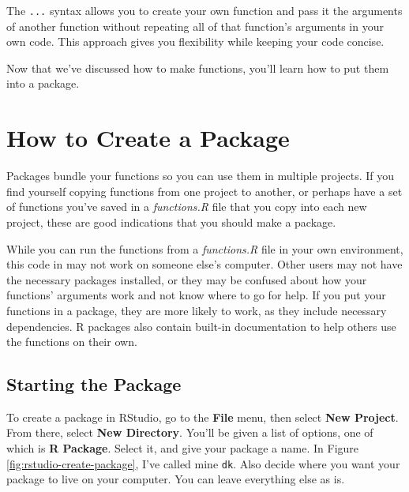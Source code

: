 \documentclass[
]{book}
\begin{document}
The \texttt{...} syntax allows you to create your own function and pass it the arguments of another function without repeating all of that function's arguments in your own code. This approach gives you flexibility while keeping your code concise.

Now that we've discussed how to make functions, you'll learn how to put them into a package.

\hypertarget{how-to-create-a-package}{%
\section*{How to Create a Package}\label{how-to-create-a-package}}

Packages bundle your functions so you can use them in multiple projects. If you find yourself copying functions from one project to another, or perhaps have a set of functions you've saved in a \emph{functions.R} file that you copy into each new project, these are good indications that you should make a package.

While you can run the functions from a \emph{functions.R} file in your own environment, this code in may not work on someone else's computer. Other users may not have the necessary packages installed, or they may be confused about how your functions' arguments work and not know where to go for help. If you put your functions in a package, they are more likely to work, as they include necessary dependencies. R packages also contain built-in documentation to help others use the functions on their own.

\hypertarget{starting-the-package}{%
\subsection*{Starting the Package}\label{starting-the-package}}

To create a package in RStudio, go to the \textbf{File} menu, then select \textbf{New Project}. From there, select \textbf{New Directory}. You'll be given a list of options, one of which is \textbf{R Package}. Select it, and give your package a name. In Figure \ref{fig:rstudio-create-package}, I've called mine \texttt{dk}. Also decide where you want your package to live on your computer. You can leave everything else as is.
\end{document}
